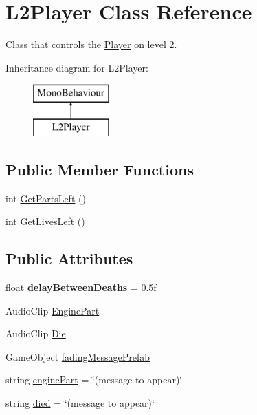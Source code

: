 \hypertarget{class_l2_player}{\section{L2\-Player Class Reference}
\label{class_l2_player}
}


Class that controls the \hyperlink{class_player}{Player} on level 2.  


Inheritance diagram for L2\-Player\-:\begin{figure}[H]
\begin{center}
\leavevmode
\includegraphics[height=2.000000cm]{class_l2_player}
\end{center}
\end{figure}
\subsection*{Public Member Functions}
\begin{DoxyCompactItemize}
\item 
int \hyperlink{class_l2_player_abf85322d2af4412614e90db0f177e5d7}{Get\-Parts\-Left} ()
\item 
int \hyperlink{class_l2_player_a0f061ad122d98387a8d1a5ab10a10a01}{Get\-Lives\-Left} ()
\end{DoxyCompactItemize}
\subsection*{Public Attributes}
\begin{DoxyCompactItemize}
\item 
\hypertarget{class_l2_player_ab1c41d90971c87411a23f19185c8df71}{float {\bfseries delay\-Between\-Deaths} = 0.\-5f}\label{class_l2_player_ab1c41d90971c87411a23f19185c8df71}

\item 
Audio\-Clip \hyperlink{class_l2_player_ae6acf2430aa6da4b449caa58077c1db7}{Engine\-Part}
\item 
Audio\-Clip \hyperlink{class_l2_player_a3fc2b5fdbd62fe694a1f20a6f085a43f}{Die}
\item 
Game\-Object \hyperlink{class_l2_player_ac539a32388cdac6aa327d71b6646727b}{fading\-Message\-Prefab}
\item 
string \hyperlink{class_l2_player_ac303dbde290736bcbe225855c71e3dc4}{engine\-Part} = \char`\"{}(message to appear)\char`\"{}
\item 
string \hyperlink{class_l2_player_a354ec1eb77d1e1bceac1ea9f0205dab9}{died} = \char`\"{}(message to appear)\char`\"{}
\end{DoxyCompactItemize}


